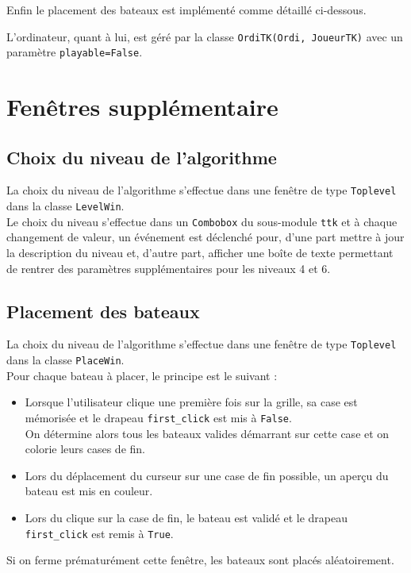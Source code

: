 Enfin le placement des bateaux est implémenté comme détaillé ci-dessous.

\medskip

L'ordinateur, quant à lui, est géré par la classe \texttt{OrdiTK(Ordi, JoueurTK)} avec un paramètre \texttt{playable=False}.

\section{Fenêtres supplémentaire}
\subsection{Choix du niveau de l'algorithme}
La choix du niveau de l'algorithme s'effectue dans une fenêtre de type \texttt{Toplevel} dans la classe \texttt{LevelWin}.\\
Le choix du niveau s'effectue dans un \texttt{Combobox} du sous-module \texttt{ttk} et à chaque changement de valeur, un événement est déclenché pour, d'une part mettre à jour la description du niveau et, d'autre part, afficher une boîte de texte permettant de rentrer des paramètres supplémentaires pour les niveaux 4 et 6.

\subsection{Placement des bateaux}
La choix du niveau de l'algorithme s'effectue dans une fenêtre de type \texttt{Toplevel} dans la classe \texttt{PlaceWin}.\\
Pour chaque bateau à placer, le principe est le suivant :
\begin{itemize}
\item Lorsque l'utilisateur clique une première fois sur la grille, sa case est mémorisée et le drapeau \texttt{first\_click} est mis à \texttt{False}.\\
On détermine alors tous les bateaux valides démarrant sur cette case et on colorie leurs cases de fin.
\item  Lors du déplacement du curseur sur une case de fin possible, un aperçu du bateau est mis en couleur.
\item Lors du clique sur la case de fin, le bateau est validé et le drapeau \texttt{first\_click} est remis à \texttt{True}.
\end{itemize}
Si on ferme prématurément cette fenêtre, les bateaux sont placés aléatoirement.
